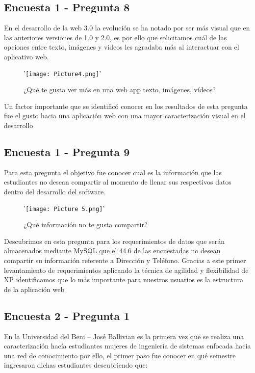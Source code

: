 \documentclass[hidelinks]{Documento}
\begin{document}
\subsection{Encuesta 1 - Pregunta 8}

En el desarrollo de la web 3.0 la evolución se ha notado por ser más visual que en las anteriores versiones de 1.0 y 2.0, es por ello que solicitamos cuál de las opciones entre texto, imágenes y videos les agradaba más al interactuar con el aplicativo web.

\begin{figure}[h]
\centering
'\texttt{[image: Picture4.png]}'
\caption{¿Qué te gusta ver más en una web app texto, imágenes, vídeos?}
\label{fig:Picture4.png}
\end{figure}

Un factor importante que se identificó conocer en los resultados de esta pregunta fue el gusto hacia una aplicación web con una mayor caracterización visual en el desarrollo

\subsection{Encuesta 1 - Pregunta 9}

Para esta pregunta el objetivo fue conocer cual es la información que las estudiantes no desean compartir al momento de llenar sus respectivos datos dentro del desarrollo del software.

\begin{figure}[h]
\centering
'\texttt{[image: Picture 5.png]}'
\caption{¿Qué información no te gusta compartir?}
\label{fig:Picture5.png}
\end{figure}

Descubrimos en esta pregunta para los requerimientos de datos que serán almacenados mediante MySQL que el 44.6 de las encuestadas no desean compartir su información referente a Dirección y Teléfono. Gracias a este primer levantamiento de requerimientos aplicando la técnica de agilidad y flexibilidad de XP identificamos que lo más importante para nuestros usuarios es la estructura de la aplicación web

\subsection{Encuesta 2 - Pregunta 1}

En la Universidad del Beni – José Ballivian es la primera vez que se realiza una caracterización hacía estudiantes mujeres de ingeniería de sistemas enfocada hacia una red de conocimiento por ello, el primer paso fue conocer en qué semestre ingresaron dichas estudiantes descubriendo que:
\end{document}
